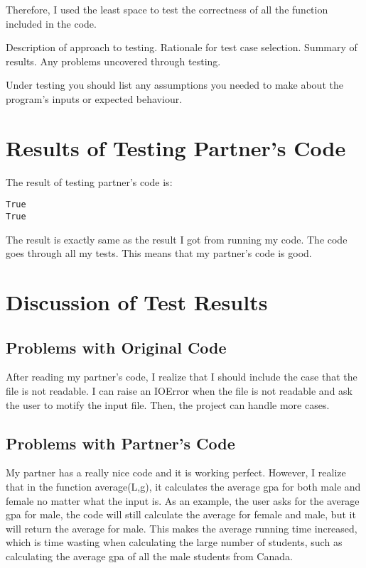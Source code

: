 \documentclass[12pt]{article}
\begin{document}
Therefore, I used the least space to test the correctness of all the function included in the code.  

Description of approach to testing.  Rationale for test case selection.  Summary
of results.  Any problems uncovered through testing.

Under testing you should list any assumptions you needed to make about the
program's inputs or expected behaviour.

\section{Results of Testing Partner's Code}

The result of testing partner's code is:
\begin{lstlisting}
True
True

\end{lstlisting}

The result is exactly same as the result I got from running my code. The code goes through all my tests. This means that my partner's code is good.



\section{Discussion of Test Results}

\subsection{Problems with Original Code}

After reading my partner's code, I realize that I should include the case that the file is not readable. I can raise an IOError when the file is not readable and ask the user to motify the input file.
Then, the project can handle more cases.


\subsection{Problems with Partner's Code}

My partner has a really nice code and it is working perfect. However, I realize that in the function average(L,g), it calculates the average gpa for both male and female no matter what the input is. As an example, the user asks for the average gpa for male, the code will still calculate the average for female and male, but it will return the average for male. This makes the average running time increased, which is time wasting when calculating the large number of students, such as calculating the average gpa of all the male students from Canada.
\end{document}
